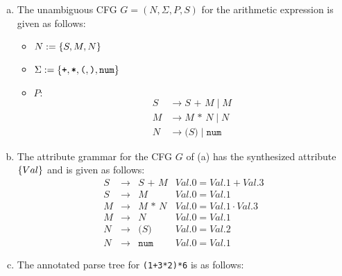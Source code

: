 \begin{solution}
\begin{enumerate}[(a)]
  \item The unambiguous CFG $G = (N, \Sigma, P, S)$ for the arithmetic expression is given as follows:
    \begin{itemize}
        \item $N := \left\{ S, M, N \right\}$
        \item $\Sigma := \left\{ \texttt{+}, \texttt{*}, \texttt{(}, \texttt{)}, \texttt{num} \right\}$
        \item $P:$
        \begin{align*}
            S & \to S \texttt{ + } M \mid M \\
            M & \to M \texttt{ * } N \mid N \\
            N & \to \texttt{(} S \texttt{)} \mid \texttt{num}
        \end{align*}
    \end{itemize}

  \item The attribute grammar for the CFG $G$ of (a) has the synthesized attribute $\left\{ Val \right\}$ and is given as follows:
    \[
    \begin{array}{lcll}
        S & \to & S \texttt{ + } M        & Val.0 = Val.1 + Val.3 \\
        S & \to & M                       & Val.0 = Val.1 \\
        M & \to & M \texttt{ * } N        & Val.0 = Val.1 \cdot Val.3 \\
        M & \to & N                       & Val.0 = Val.1 \\
        N & \to & \texttt{(} S \texttt{)} & Val.0 = Val.2 \\
        N & \to & \texttt{num}            & Val.0 = Val.1
    \end{array}
    \]

  \item The annotated parse tree for \texttt{(1+3*2)*6} is as follows:
    \begin{center}
\end{center}
\end{enumerate}
\end{solution}
